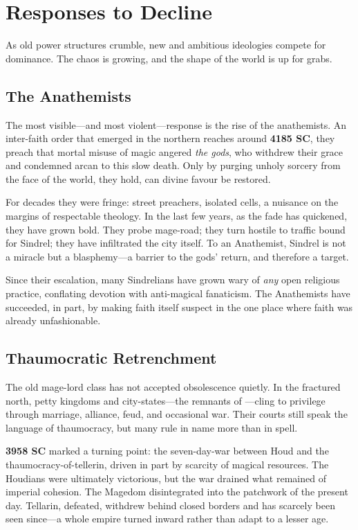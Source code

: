 \section{Responses to Decline}

As old power structures crumble, new and ambitious ideologies compete for dominance. The chaos is growing, and the shape of the world is up for grabs.

\subsection{The Anathemists}

The most visible---and most violent---response is the rise of the \glspl{anathemist}. An inter-faith order that emerged in the northern reaches around \textbf{4185 SC}, they preach that mortal misuse of magic angered \emph{the gods}, who withdrew their grace and condemned \gls{arcan} to this slow death. Only by purging unholy sorcery from the face of the world, they hold, can divine favour be restored.

For decades they were fringe: street preachers, isolated cells, a nuisance on the margins of respectable theology. In the last few years, as the fade has quickened, they have grown bold. They probe \gls{mage-road}; they turn hostile to traffic bound for Sindrel; they have infiltrated the city itself. To an Anathemist, Sindrel is not a miracle but a blasphemy---a barrier to the gods' return, and therefore a target.

Since their escalation, many Sindrelians have grown wary of \emph{any} open religious practice, conflating devotion with anti-magical fanaticism. The Anathemists have succeeded, in part, by making faith itself suspect in the one place where faith was already unfashionable.

\subsection{Thaumocratic Retrenchment}

The old mage-lord class has not accepted obsolescence quietly. In the fractured north, petty kingdoms and city-states---the remnants of ---cling to privilege through marriage, alliance, feud, and occasional war. Their courts still speak the language of thaumocracy, but many rule in name more than in spell.

\textbf{3958 SC} marked a turning point: the \gls{seven-day-war} between Houd and the \gls{thaumocracy-of-tellerin}, driven in part by scarcity of magical resources. The Houdians were ultimately victorious, but the war drained what remained of imperial cohesion. The Magedom disintegrated into the patchwork of the present day. Tellarin, defeated, withdrew behind closed borders and has scarcely been seen since---a whole empire turned inward rather than adapt to a lesser age.

